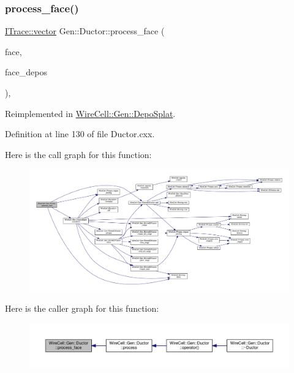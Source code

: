 \subsubsection{\texorpdfstring{process\+\_\+face()}{process\_face()}}
{\footnotesize\ttfamily \hyperlink{class_wire_cell_1_1_i_data_ae1a9f863380499bb43f39fabb6276660}{I\+Trace\+::vector} Gen\+::\+Ductor\+::process\+\_\+face (\begin{DoxyParamCaption}\item[{\hyperlink{class_wire_cell_1_1_interface_a09c548fb8266cfa39afb2e74a4615c37}{I\+Anode\+Face\+::pointer}}]{face,  }\item[{const \hyperlink{class_wire_cell_1_1_i_data_ae1a9f863380499bb43f39fabb6276660}{I\+Depo\+::vector} \&}]{face\+\_\+depos }\end{DoxyParamCaption})\hspace{0.3cm}{\ttfamily [protected]}, {\ttfamily [virtual]}}



Reimplemented in \hyperlink{class_wire_cell_1_1_gen_1_1_depo_splat_a53de1c32277ad2c62b0f81760f8dcdc8}{Wire\+Cell\+::\+Gen\+::\+Depo\+Splat}.



Definition at line 130 of file Ductor.\+cxx.

Here is the call graph for this function\+:
\nopagebreak
\begin{figure}[H]
\begin{center}
\leavevmode
\includegraphics[width=350pt]{class_wire_cell_1_1_gen_1_1_ductor_afec4558613941dc3bb752a3811aadd3d_cgraph}
\end{center}
\end{figure}
Here is the caller graph for this function\+:
\nopagebreak
\begin{figure}[H]
\begin{center}
\leavevmode
\includegraphics[width=350pt]{class_wire_cell_1_1_gen_1_1_ductor_afec4558613941dc3bb752a3811aadd3d_icgraph}
\end{center}
\end{figure}
\mbox{\label{class_wire_cell_1_1_gen_1_1_ductor_acf493c7246a3fb10a52edf8f9cba9e97}} 
